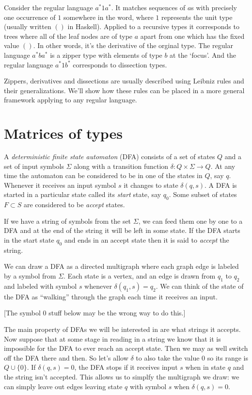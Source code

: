 \documentclass[authoryear,preprint]{sigplanconf}
\newcommand{\Varid}[1]{\mathit{#1}}
\begin{document}
Consider the regular language $a^\ast1a^\ast$. It matches sequences of $a$s with precisely one occurrence of $1$ somewhere in the word, where $1$ represents the unit type (usually written \ensuremath{()} in Haskell). Applied to a recursive types it corresponds to trees where all of the leaf nodes are of type \ensuremath{\Varid{a}} apart from one which has the fixed value \ensuremath{()}. In other words, it's the derivative of the orginal type. The regular language $a^\ast ba^\ast$ is a zipper type with elements of type $b$ at the `focus'. And the regular language $a^\ast1b^\ast$ corresponds to dissection types.

Zippers, derivatives and dissections are usually described using Leibniz rules and their generalizations. We'll show how these rules can be placed in a more general framework applying to any regular language.

\section{Matrices of types}
\label{sec:matrices-of-types}
A {\it deterministic finite state automaton} (DFA) consists of a set of states $Q$ and a set of input symbols $\Sigma$ along with a transition function $\delta:Q\times\Sigma\rightarrow Q$. At any time the automaton can be considered to be in one of the states in $Q$, say $q$. Whenever it receives an input symbol $s$ it changes to state $\delta(q,s)$. A DFA is started in a particular state called its {\it start} state, say $q_0$. Some subset of states $F\subset S$ are considered to be {\it accept} states.

If we have a string of symbols from the set $\Sigma$, we can feed them one by one to a DFA and at the end of the string it will be left in some state. If the DFA starts in the start state $q_0$ and ends in an accept state then it is said to {\it accept} the string.

We can draw a DFA as a directed multigraph where each graph edge is labeled by a symbol from $\Sigma$. Each state is a vertex, and an edge is drawn from $q_1$ to $q_2$ and labeled with symbol $s$ whenever $\delta(q_1,s)=q_2$. We can think of the state of the DFA as ``walking'' through the graph each time it receives an input.

[The symbol $0$ stuff below may be the wrong way to do this.]

The main property of DFAs we will be interested in are what strings it accepts. Now suppose that at some stage in reading in a string we know that it is impossible for the DFA to ever reach an accept state. Then we may as well switch off the DFA there and then. So let's allow $\delta$ to also take the value $0$ so its range is $Q\cup\{0\}$. If $\delta(q,s)=0$, the DFA stops if it receives input $s$ when in state $q$ and the string isn't accepted. This allows us to simplfy the multigraph we draw: we can simply leave out edges leaving state $q$ with symbol $s$ when $\delta(q,s)=0$.
\end{document}
